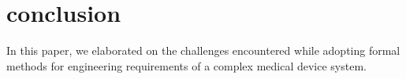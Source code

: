 

\section{conclusion}
\label{sec:conclusion}
In this paper, we elaborated on the challenges encountered while adopting formal methods for engineering requirements of a complex medical device system.


